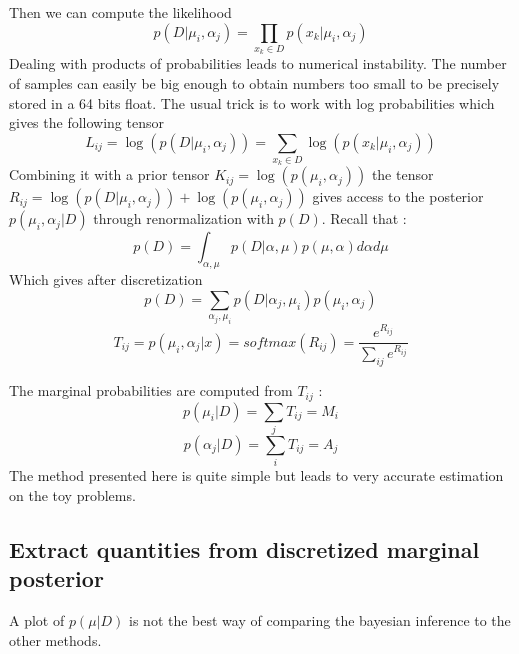 Then we can compute the likelihood
\begin{equation}
	p(D|\mu_i, \alpha_j) = \prod_{x_k\in D} p(x_k|\mu_i, \alpha_j)
\end{equation}
Dealing with products of probabilities leads to numerical instability.
The number of samples can easily be big enough to obtain numbers too small to be precisely stored in a 64 bits float.
The usual trick is to work with log probabilities which gives the following tensor 
\begin{equation}
	L_{ij} = \log (p(D|\mu_i, \alpha_j)) = \sum_{x_k\in D} \log (p(x_k|\mu_i, \alpha_j))
\end{equation}
Combining it with a prior tensor $K_{ij} = \log(p(\mu_i, \alpha_j))$ the tensor $ R_{ij} = \log(p(D|\mu_i, \alpha_j)) + \log(p(\mu_i, \alpha_j) )$ gives access to the posterior $p(\mu_i, \alpha_j | D)$ through renormalization with $p(D)$.
Recall that :
\begin{equation}
    p(D) = \int_{\alpha, \mu} p(D|\alpha, \mu) p(\mu, \alpha) d\alpha d\mu
\end{equation}
Which gives after discretization
\begin{equation}
    p(D) = \sum_{\alpha_j, \mu_i} p(D|\alpha_j, \mu_i) p(\mu_i, \alpha_j)
\end{equation}
\begin{equation}
	T_{ij} = p(\mu_i, \alpha_j | x) = softmax(R_{ij}) = \frac{ e^{ R_{ij} }  }{ \sum_{ij} e^{ R_{ij} } }
\end{equation}

The marginal probabilities are computed from $T_{ij}$ :
\begin{equation}
	p(\mu_i | D) = \sum_j T_{ij} = M_i
\end{equation}
\begin{equation}
  p(\alpha_j | D) = \sum_i T_{ij} = A_j
\end{equation}
The method presented here is quite simple but leads to very accurate estimation on the toy problems.





\subsection{Extract quantities from discretized marginal posterior} %
\label{sub:extract_quantities_from_discretized_marginal_posterior}

A plot of $p(\mu | D)$ is not the best way of comparing the bayesian inference to the other methods.

